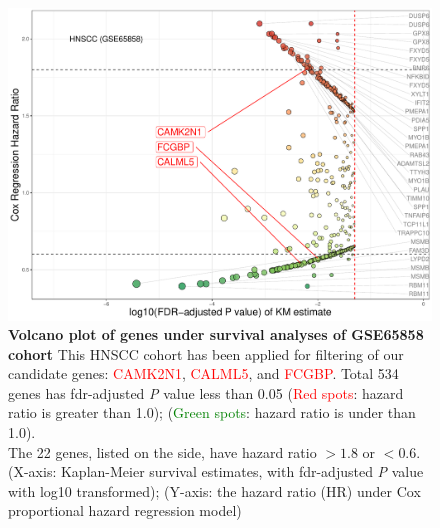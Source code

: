 \documentclass[preprint,12pt]{elsarticle}
\newcommand{\bcaption}[2]{\caption{\textbf{#1} #2}}
\newenvironment{MyColorPar}[1]{%
    \leavevmode\color{#1}\ignorespaces%
}{%
}%
\begin{document}
\begin{MyColorPar}{blue}
\begin{figure}
    \centering
    \includegraphics[width=13cm]{Rplot_GSE65858_CoxHR_CAMK2N1_top3FDRKM.pdf}
    \bcaption{Volcano plot of genes under survival analyses of GSE65858 cohort}{
    This HNSCC cohort has been applied for filtering of our candidate genes: \textcolor{red}{CAMK2N1}, \textcolor{red}{CALML5}, and \textcolor{red}{FCGBP}.
    Total 534 genes has \acrshort{fdr}-adjusted \textit{P} value less than 0.05
    (\textcolor{red}{Red spots}: hazard ratio is greater than 1.0);
    (\textcolor{green}{Green spots}: hazard ratio is under than 1.0).\\
    The 22 genes, listed on the side, have hazard ratio $> 1.8$ or $< 0.6$.\\
    (X-axis: Kaplan-Meier survival estimates, with \acrshort{fdr}-adjusted \textit{P} value with log10 transformed);
    (Y-axis: the hazard ratio (HR) under Cox proportional hazard regression model)
    }
    \label{fig:hazards534}
\end{figure}







\end{MyColorPar}
\end{document}
